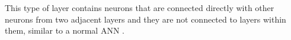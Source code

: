 This type of layer contains neurons that are connected directly with other neurons from two adjacent layers and they are not connected to layers within them, similar to a normal ANN \cite{IntroCNN}. 